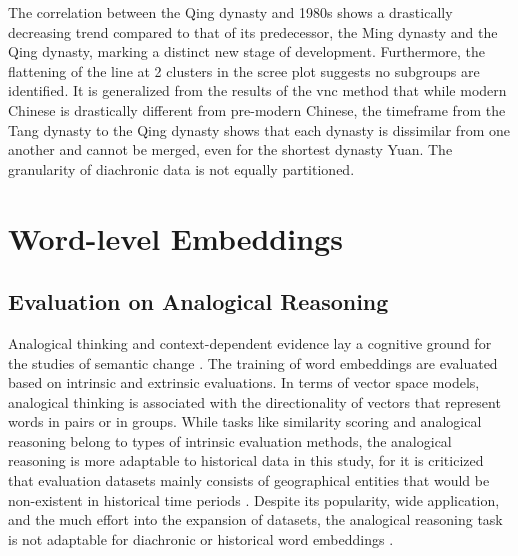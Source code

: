 The correlation between the Qing dynasty and 1980s shows a drastically decreasing trend compared to that of its predecessor, the Ming dynasty and the Qing dynasty, marking a distinct new stage of development. Furthermore, the flattening of the line at 2 clusters in the scree plot suggests no subgroups are identified. It is generalized from the results of the \gls{vnc} method that while modern Chinese is drastically different from pre-modern Chinese, the timeframe from the Tang dynasty to the Qing dynasty shows that each dynasty is dissimilar from one another and cannot be merged, even for the shortest dynasty Yuan. The granularity of diachronic data is not equally partitioned.


\section{Word-level Embeddings}

\subsection{Evaluation on Analogical Reasoning}
Analogical thinking and context-dependent evidence lay a cognitive ground for the studies of semantic change \parencite{traugott2017semantic}. The training of word embeddings are evaluated based on intrinsic and extrinsic evaluations. In terms of vector space models, analogical thinking is associated with the directionality of vectors that represent words in pairs or in groups. While tasks like similarity scoring and analogical reasoning belong to types of intrinsic evaluation methods, the analogical reasoning is more adaptable to historical data in this study, for it is criticized that evaluation datasets mainly consists of geographical entities that would be non-existent in historical time periods \parencite{wevers2020digital,li2018analogical}. Despite its popularity, wide application, and the much effort into the expansion of datasets, the analogical reasoning task is not adaptable for diachronic or historical word embeddings \parencite{wevers2020digital}.

